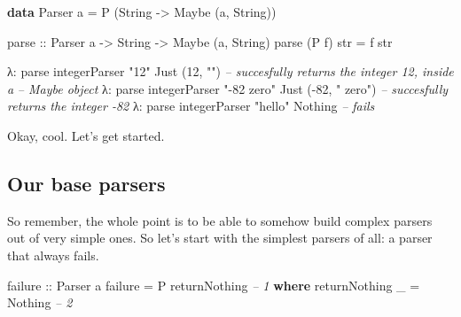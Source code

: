 \documentclass[]{article}
\newenvironment{Shaded}{}{}
\newcommand{\KeywordTok}[1]{\textcolor[rgb]{0.00,0.44,0.13}{\textbf{{#1}}}}
\newcommand{\DataTypeTok}[1]{\textcolor[rgb]{0.56,0.13,0.00}{{#1}}}
\newcommand{\DecValTok}[1]{\textcolor[rgb]{0.25,0.63,0.44}{{#1}}}
\newcommand{\StringTok}[1]{\textcolor[rgb]{0.25,0.44,0.63}{{#1}}}
\newcommand{\CommentTok}[1]{\textcolor[rgb]{0.38,0.63,0.69}{\textit{{#1}}}}
\newcommand{\OtherTok}[1]{\textcolor[rgb]{0.00,0.44,0.13}{{#1}}}
\newcommand{\FunctionTok}[1]{\textcolor[rgb]{0.02,0.16,0.49}{{#1}}}
\newcommand{\NormalTok}[1]{{#1}}
\begin{document}
\begin{Shaded}
\begin{Highlighting}[]
\KeywordTok{data} \DataTypeTok{Parser} \NormalTok{a }\FunctionTok{=} \DataTypeTok{P} \NormalTok{(}\DataTypeTok{String} \OtherTok{->} \DataTypeTok{Maybe} \NormalTok{(a, }\DataTypeTok{String}\NormalTok{))}

\OtherTok{parse ::} \DataTypeTok{Parser} \NormalTok{a }\OtherTok{->} \DataTypeTok{String} \OtherTok{->} \DataTypeTok{Maybe} \NormalTok{(a, }\DataTypeTok{String}\NormalTok{)}
\NormalTok{parse (}\DataTypeTok{P} \NormalTok{f) str }\FunctionTok{=} \NormalTok{f str}
\end{Highlighting}
\end{Shaded}

\begin{Shaded}
\begin{Highlighting}[]
\NormalTok{λ}\FunctionTok{:} \NormalTok{parse integerParser }\StringTok{"12"}
\DataTypeTok{Just} \NormalTok{(}\DecValTok{12}\NormalTok{, }\StringTok{""}\NormalTok{)               }\CommentTok{-- succesfully returns the integer 12, inside a}
                            \CommentTok{-- Maybe object}
\NormalTok{λ}\FunctionTok{:} \NormalTok{parse integerParser }\StringTok{"-82 zero"}
\DataTypeTok{Just} \NormalTok{(}\FunctionTok{-}\DecValTok{82}\NormalTok{, }\StringTok{" zero"}\NormalTok{)         }\CommentTok{-- succesfully returns the integer -82}
\NormalTok{λ}\FunctionTok{:} \NormalTok{parse integerParser }\StringTok{"hello"}
\DataTypeTok{Nothing}                     \CommentTok{-- fails}
\end{Highlighting}
\end{Shaded}

Okay, cool. Let's get started.

\subsection{Our base parsers}\label{our-base-parsers}

So remember, the whole point is to be able to somehow build complex parsers out of very simple ones.
So let's start with the simplest parsers of all: a parser that always fails.

\begin{Shaded}
\begin{Highlighting}[]
\OtherTok{failure ::} \DataTypeTok{Parser} \NormalTok{a}
\NormalTok{failure }\FunctionTok{=} \DataTypeTok{P} \NormalTok{returnNothing                   }\CommentTok{-- 1}
    \KeywordTok{where}
        \NormalTok{returnNothing _ }\FunctionTok{=} \DataTypeTok{Nothing}           \CommentTok{-- 2}
\end{Highlighting}
\end{Shaded}
\end{document}

